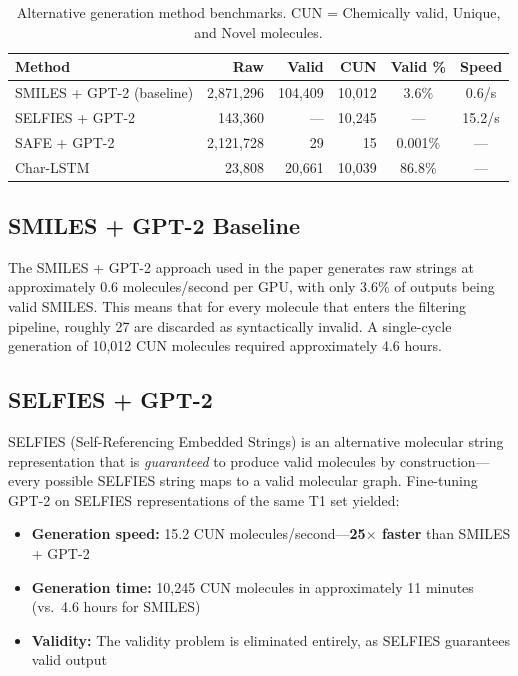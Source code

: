\documentclass[11pt,a4paper]{article}
\begin{document}
\begin{table}[H]
\centering
\caption{Alternative generation method benchmarks. CUN = Chemically valid, Unique, and Novel molecules.}
\label{tab:alternatives}
\begin{tabular}{lrrrcc}
\toprule
Method & Raw & Valid & CUN & Valid \% & Speed \\
\midrule
SMILES + GPT-2 (baseline) & 2,871,296 & 104,409 & 10,012 & 3.6\% & 0.6/s \\
SELFIES + GPT-2 & 143,360 & --- & 10,245 & --- & 15.2/s \\
SAFE + GPT-2 & 2,121,728 & 29 & 15 & 0.001\% & --- \\
Char-LSTM & 23,808 & 20,661 & 10,039 & 86.8\% & --- \\
\bottomrule
\end{tabular}
\end{table}

\subsection{SMILES + GPT-2 Baseline}

The SMILES + GPT-2 approach used in the paper generates raw strings at approximately 0.6 molecules/second per GPU, with only 3.6\% of outputs being valid SMILES. This means that for every molecule that enters the filtering pipeline, roughly 27 are discarded as syntactically invalid. A single-cycle generation of 10,012 CUN molecules required approximately 4.6 hours.

\subsection{SELFIES + GPT-2}

SELFIES (Self-Referencing Embedded Strings) is an alternative molecular string representation that is \textit{guaranteed} to produce valid molecules by construction---every possible SELFIES string maps to a valid molecular graph. Fine-tuning GPT-2 on SELFIES representations of the same T1 set yielded:
\begin{itemize}[nosep]
    \item \textbf{Generation speed:} 15.2 CUN molecules/second---\textbf{25$\times$ faster} than SMILES + GPT-2
    \item \textbf{Generation time:} 10,245 CUN molecules in approximately 11 minutes (vs.\ 4.6 hours for SMILES)
    \item \textbf{Validity:} The validity problem is eliminated entirely, as SELFIES guarantees valid output
\end{itemize}
\end{document}
